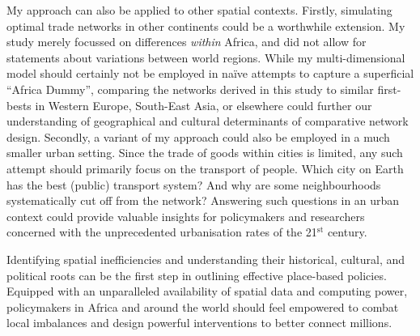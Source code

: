 \documentclass[11pt, oneside]{article}   	%
\renewcommand*\thetable{\Roman{table}}
\begin{document}
My approach can also be applied to other spatial contexts. Firstly, simulating optimal trade networks in other continents could be a worthwhile extension. My study merely focussed on differences \emph{within} Africa, and did not allow for statements about variations between world regions. While my multi-dimensional model should certainly not be employed in naïve attempts to capture a superficial ``Africa Dummy'', comparing the networks derived in this study to similar first-bests in Western Europe, South-East Asia, or elsewhere could further our understanding of geographical and cultural determinants of comparative network design. Secondly, a variant of my approach could also be employed in a much smaller urban setting. Since the trade of goods within cities is limited, any such attempt should primarily focus on the transport of people. Which city on Earth has the best (public) transport system? And why are some neighbourhoods systematically cut off from the network? Answering such questions in an urban context could provide valuable insights for policymakers and researchers concerned with the unprecedented urbanisation rates of the 21$^{\textrm{st}}$ century.

Identifying spatial inefficiencies and understanding their historical, cultural, and political roots can be the first step in outlining effective place-based policies. Equipped with an unparalleled availability of spatial data and computing power, policymakers in Africa and around the world should feel empowered to combat local imbalances and design powerful interventions to better connect millions.


\newpage
\begin{spacing}{0.7}
\setlength{\bibsep}{2.5pt plus 1.5ex}

\end{spacing}




  \newpage


  \renewcommand{\thesubsection}{\Alph{subsection}}
  \appendix
  \renewcommand{\thefigure}{A.\arabic{figure}}
  \setcounter{figure}{0}
  \renewcommand{\thetable}{A.\arabic{table}}
  \setcounter{table}{0}
  \renewcommand{\theequation}{A.\arabic{equation}}
  \setcounter{equation}{0}
  \renewcommand{\thefootnote}{A.\arabic{footnote}}
  \setcounter{footnote}{0}
\end{document}
